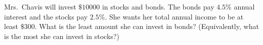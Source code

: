 Mrs.\ Chavis will invest $\$10000$ in stocks and bonds. The bonds pay $4.5\%$ annual interest and the stocks pay $2.5\%$. She wants her total annual income to be at least $\$300$. What is the least amount she can invest in bonds? (Equivalently, what is the most she can invest in stocks?)
